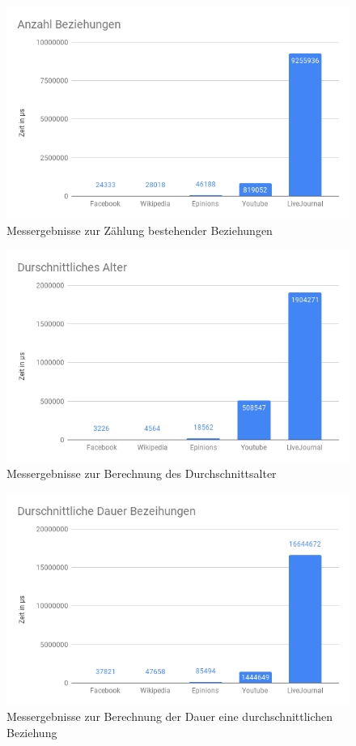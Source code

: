 \begin{figure}
	\centering
	\includegraphics[width=\textwidth]{images/AnzahlBeziehung.png}
	\caption{Messergebnisse zur Zählung bestehender Beziehungen}
	\label{fig:AnzahlBeziehung}
\end{figure}

\begin{figure}
	\centering
	\includegraphics[width=\textwidth]{images/DurschAlter.png}
	\caption{Messergebnisse zur Berechnung des Durchschnittsalter}
	\label{fig:DurschAlter}
\end{figure}

\begin{figure}
	\centering
	\includegraphics[width=\textwidth]{images/DurschBeziehung.png}
	\caption{Messergebnisse zur Berechnung der Dauer eine durchschnittlichen Beziehung}
	\label{fig:DurschBeziehung}
\end{figure}

